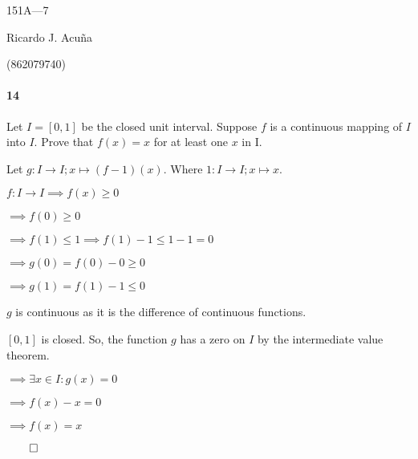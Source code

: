 \documentclass{article}
\begin{document}
\begin{center}
  151A---7

  Ricardo J. Acu\~na

  (862079740)
\end{center}\vspace{1.618em}

\paragraph{14} Let $I = [0,1]$ be the closed unit interval. Suppose $f$
is a continuous mapping of $I$ into $I$. Prove that $f(x) = x$ for at
least one $x$ in I.


Let $g:I\rightarrow I ; x\mapsto (f-1)(x)$. Where $1:I\rightarrow I;
x\mapsto x$.

$f:I\rightarrow I \implies f(x) \geq 0$

$\implies f(0) \geq 0$

$\implies f(1) \leq 1 \implies f(1) - 1 \leq 1 - 1 = 0$

$\implies g(0) = f(0) - 0 \geq 0$

$\implies g(1) = f(1) - 1 \leq 0$

$g$ is continuous as it is the difference of continuous functions.

$[0,1]$ is closed. So, the function $g$ has a zero on $I$ by the
intermediate value theorem.

$\implies \exists x\in I: g(x) = 0$

$\implies f(x)-x = 0$

$\implies f(x) = x$

$\qed$
\end{document}
